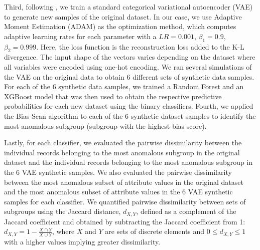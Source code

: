 \documentclass[dvipdft]{article}
\begin{document}
Third, following \cite{jang2016categorical}, we train a standard categorical variational autoencoder (VAE) to generate new samples of the original dataset. In our case, we use Adaptive Moment Estimation (ADAM) \cite{kingma2014adam} as the optimization method, which computes adaptive learning rates for each parameter with a $LR=0.001$, $\beta _1 = 0.9$, $\beta _2 = 0.999$. Here, the loss function is the reconstruction loss added to the K-L divergence. The input shape of the vectors varies depending on the dataset where all variables were encoded using one-hot encoding. We ran several simulations of the VAE on the original data to obtain 6 different sets of synthetic data samples. 
For each of the 6 synthetic data samples, we trained a Random Forest and an XGBoost model that was then used to obtain the respective predictive probabilities for each new dataset using the binary classifiers. Fourth, we applied the Bias-Scan algorithm to each of the 6 synthetic dataset samples to identify the most anomalous subgroup (subgroup with the highest bias score).

Lastly, for each classifier, we evaluated the pairwise dissimilarity between the individual records belonging to the most anomalous subgroup in the original dataset and the individual records belonging to the most anomalous subgroup in the 6 VAE synthetic samples. We also evaluated the pairwise dissimilarity between the most anomalous subset of attribute values in the original dataset and the most anomalous subset of attribute values in the 6 VAE synthetic samples for each classifier. We quantified pairwise dissimilarity between sets of subgroups using the Jaccard distance, $d_{X,Y}$, defined as a complement of the Jaccard coefficient and obtained by subtracting the Jaccard coefficient from 1: $d_{X,Y} = 1 - \frac{X\cap Y}{X\cup Y}$, where $X$ and $Y$ are sets of discrete elements and  $0$$\leq$$d_{X,Y}$$\leq$$1$ with a higher values implying greater dissimilarity.

\end{document}
